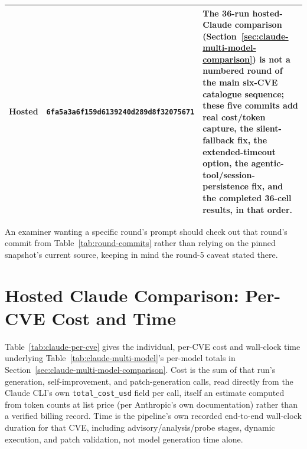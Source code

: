 \documentclass[12pt,a4paper]{report}
\begin{document}
\begin{table}[H]
\begin{tabular}{@{}p{1.2cm}p{2.6cm}p{8.7cm}@{}}
Hosted & \texttt{6fa5a3a}\newline \texttt{6f159d6}\newline \texttt{139240d}\newline \texttt{289d8f3}\newline \texttt{2075671} & The 36-run hosted-Claude comparison (Section~\ref{sec:claude-multi-model-comparison}) is not a numbered round of the main six-CVE catalogue sequence; these five commits add real cost/token capture, the silent-fallback fix, the extended-timeout option, the agentic-tool/session-persistence fix, and the completed 36-cell results, in that order. \\
\bottomrule
\end{tabular}
\end{table}

An examiner wanting a specific round's prompt should check out that round's commit from Table~\ref{tab:round-commits} rather than relying on the pinned snapshot's current source, keeping in mind the round-5 caveat stated there.

\section{Hosted Claude Comparison: Per-CVE Cost and Time}
\label{app:claude-per-cve}

Table~\ref{tab:claude-per-cve} gives the individual, per-CVE cost and wall-clock time underlying Table~\ref{tab:claude-multi-model}'s per-model totals in Section~\ref{sec:claude-multi-model-comparison}. Cost is the sum of that run's generation, self-improvement, and patch-generation calls, read directly from the Claude CLI's own \texttt{total\_cost\_usd} field per call, itself an estimate computed from token counts at list price (per Anthropic's own documentation) rather than a verified billing record. Time is the pipeline's own recorded end-to-end wall-clock duration for that CVE, including advisory/analysis/probe stages, dynamic execution, and patch validation, not model generation time alone.
\end{document}
